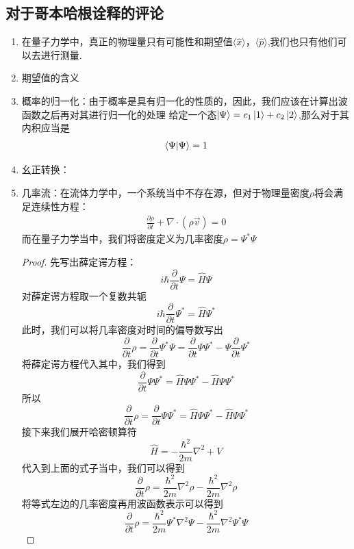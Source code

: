 \documentclass{article}
\begin{document}
\subsection{对于哥本哈根诠释的评论}
\begin{enumerate}
    \item 在量子力学中，真正的物理量只有可能性和期望值$\langle\hat{x}\rangle，\langle\hat{p}\rangle$,我们也只有他们可以去进行测量.
    \item 期望值的含义
    \item 概率的归一化：由于概率是具有归一化的性质的，因此，我们应该在计算出波函数之后再对其进行归一化的处理
    给定一个态$\ket{\Psi}=c_1\ket{1}+c_2\ket{2}$,那么对于其内积应当是
    \begin{align*}
        \braket{\Psi}{\Psi}=1
    \end{align*}
    \item 幺正转换：
    \item 几率流：在流体力学中，一个系统当中不存在源，但对于物理量密度$\rho$将会满足连续性方程：
    \begin{align*}
    \frac{\partial \rho}{\partial t}+\nabla\cdot(\rho\vec{v})=0
    \end{align*}
    而在量子力学当中，我们将密度定义为几率密度$\rho=\Psi^*\Psi$
    \begin{proof}
        先写出薛定谔方程：
        \[
        i\hbar\frac{\partial}{\partial t}\Psi=\hat{H}\Psi
        \]
        对薛定谔方程取一个复数共轭
        \[
        i\hbar\frac{\partial}{\partial t}\Psi^*=\hat{H}\Psi^*
        \]
        此时，我们可以将几率密度对时间的偏导数写出
        \[
        \frac{\partial}{\partial t}\rho=\frac{\partial}{\partial t}\Psi^*\Psi=\frac{\partial}{\partial t}\Psi\Psi^*-\Psi\frac{\partial}{\partial t}\Psi^*
        \]
        将薛定谔方程代入其中，我们得到
        \[
        \frac{\partial}{\partial t}\Psi\Psi^*=\hat{H}\Psi\Psi^*-\hat{H}\Psi\Psi^*
        \]
        所以
        \[
        \frac{\partial}{\partial t}\rho=\frac{\partial}{\partial t}\Psi\Psi^*=\hat{H}\Psi\Psi^*-\hat{H}\Psi\Psi^*
        \]
        接下来我们展开哈密顿算符
        \[
        \hat{H}=-\frac{\hbar^2}{2m}\nabla^2+V
        \]
        代入到上面的式子当中，我们可以得到
        \[
        \frac{\partial}{\partial t}\rho=\frac{\hbar^2}{2m}\nabla^2\rho-\frac{\hbar^2}{2m}\nabla^2\rho
        \]
        将等式左边的几率密度再用波函数表示可以得到
        \[
        \frac{\partial}{\partial t}\rho=\frac{\hbar^2}{2m}\Psi^*\nabla^2\Psi-\frac{\hbar^2}{2m}\nabla^2\Psi^*\Psi
        \]
    \end{proof}

\end{enumerate}
\end{document}
